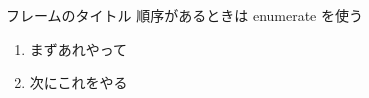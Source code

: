 \begin{frame}{フレームのタイトル}
  順序があるときは enumerate を使う

  \begin{enumerate}
  \item まずあれやって
  \item 次にこれをやる
  \end{enumerate}
\end{frame}

